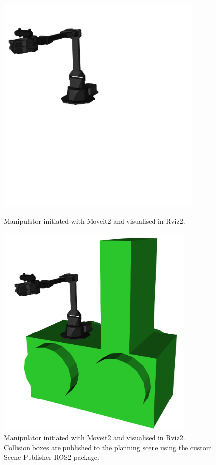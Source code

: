\begin{figure}[htp!]
  \centering
  \begin{minipage}[b]{0.49\textwidth}
        \centering
        \includegraphics[width = 0.9\textwidth]{Figures/figScenePublisher1.png}
        \caption{Manipulator initiated with Moveit2 and visualised in Rviz2.}
        \label{fig:R:P&P:CSP:scenePublisher1}
  \end{minipage}
  \hfill
  \begin{minipage}[b]{0.49\textwidth}
    \centering
    \includegraphics[width = 0.86\textwidth]{Figures/figScenePublisher2.png}
    \caption{Manipulator initiated with Moveit2 and visualised in Rviz2. Collision boxes are published to the planning scene using the custom Scene Publisher ROS2 package.}
    \label{fig:R:P&P:CSP:scenePublisher2}
  \end{minipage}
\end{figure}


